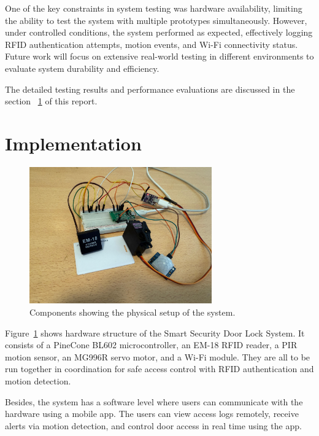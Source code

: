 \documentclass[a4paper]{scrartcl}
\begin{document}
One of the key constraints in system testing was hardware availability, limiting the ability to test the system with multiple prototypes simultaneously. However, under controlled conditions, the system performed as expected, effectively logging RFID authentication attempts, motion events, and Wi-Fi connectivity status. Future work will focus on extensive real-world testing in different environments to evaluate system durability and efficiency.

The detailed testing results and performance evaluations are discussed in the section ~\ref{sec:implementation} of this report.



\section{Implementation}
\label{sec:implementation} 
\begin{figure}[H]
    \centering
    \includegraphics[width=0.7\textwidth]{comp.pdf}
    \caption{Components  showing the physical setup of the system.}
    \label{fig:comp}
    
\end{figure}
Figure~\ref{fig:comp} shows  hardware structure of the Smart Security Door Lock System. It consists of a PineCone BL602 microcontroller, an EM-18 RFID reader, a PIR motion sensor, an MG996R servo motor, and a Wi-Fi module. They are all to be run together in coordination for safe access control with RFID authentication and motion detection.

Besides, the system has a software level where users can communicate with the hardware using a mobile app. The users can view access logs remotely, receive alerts via motion detection, and control door access in real time using the app.
\end{document}
